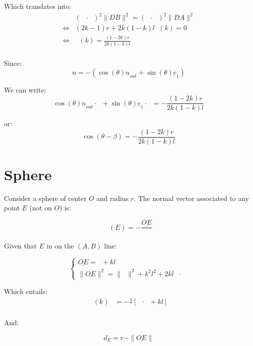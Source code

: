 \documentclass[10pt,a4paper]{article}
\newcommand{\ud}[1]{\underline{#1}}
\DeclareMathOperator{\DA}{\ud{DA}}
\DeclareMathOperator{\DB}{\ud{DB}}
\DeclareMathOperator{\OA}{\ud{OA}}
\DeclareMathOperator{\e}{\ud{e}}
\DeclareMathOperator{\n}{\ud{n}}
\DeclareMathOperator{\en}{\ud{e}\cdot\ud{n}}
\DeclareMathOperator{\OEn}{\|\ud{OE}\|}
\begin{document}
Which translates into:
$$
\begin{array}{ll}
    & (\DA\cdot\n)^2 \|DB\|^2 = (\DB\cdot\n)^2 \|DA\|^2\\
    \Leftrightarrow &
    (2k - 1)r + 2k(1 - k)l\en(k) = 0\\
    \Leftrightarrow &
    \en(k) = \frac{(1 - 2k)r}{2k(1 - k)l}\\
\end{array}
$$


Since:
$$
\ud{n} = -(\cos(\theta)\ud{n}_{out} + \sin(\theta)\ud{e}_1)
$$

We can write:
$$
\cos(\theta)\ud{n}_{out}\cdot\e + \sin(\theta)\ud{e}_1\cdot\e = -\frac{(1 - 2k)r}{2k(1 - k)l}
$$

or:
$$
\cos(\theta - \beta) = -\frac{(1 - 2k)r}{2k(1 - k)l}
$$


\newpage
\section{Sphere}

Consider a sphere of center $O$ and radius $r$.
The normal vector associated to any point $E$ (not on $O$) is:

$$
\n(E) = - \frac{\ud{OE}}{\OEn}
$$

Given that $E$ in on the $(A, B)$ line:

$$
\left\{
\begin{array}{ll}
    \ud{OE} = \OA + kl\e\\
    \|\ud{OE}\|^2 = \|\OA\|^2 + k^2l^2 + 2kl\OA\cdot\e
\end{array}
\right.
$$

Which entails:
$$
\begin{array}{ll}
    \en(k)
    & = - \frac{1}{\OEn}\left[ \OA \cdot \e  + kl \right]\\
\end{array}
$$

And:

$$
d_E = r - \|\ud{OE}\|
$$
\end{document}
